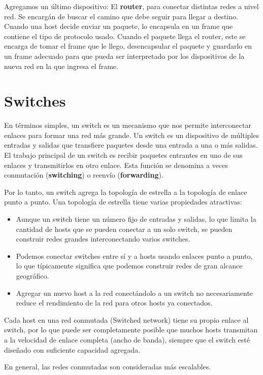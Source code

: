 Agregamos un último dispositivo: El \textbf{router}, para conectar distintas redes a nivel red. Se encargán de buscar el camino que debe seguir para llegar a destino. Cuando una host decide enviar un paquete, lo encapsula en un frame que contiene el tipo de protocolo usado. Cuando el paquete llega el router, este se encarga de tomar el frame que le llego, desencapsular el paquete y guardarlo en un frame adecuado para que pueda ser interpretado por los dispositivos de la nueva red en la que ingresa el frame.

\section{Switches}
En términos simples, un switch es un mecanismo que nos permite interconectar enlaces para formar una red más grande. Un switch es un dispositivo de múltiples entradas y salidas que transfiere paquetes desde una entrada a una o más salidas. El trabajo principal de un switch es recibir paquetes entrantes en uno de sus enlaces y transmitirlos en otro enlace. Esta función se denomina a veces conmutación (\textbf{switching}) o reenvío (\textbf{forwarding}).

Por lo tanto, un switch agrega la topología de estrella a la topología de enlace punto a punto. Una topología de estrella tiene varias propiedades atractivas:

\begin{itemize}
  \item Aunque un switch tiene un número fijo de entradas y salidas, lo que limita la cantidad de hosts que se pueden conectar a un solo switch, se pueden construir redes grandes interconectando varios switches.
  \item Podemos conectar switches entre sí y a hosts usando enlaces punto a punto, lo que típicamente significa que podemos construir redes de gran alcance geográfico.
  \item Agregar un nuevo host a la red conectándolo a un switch no necesariamente reduce el rendimiento de la red para otros hosts ya conectados.
\end{itemize}

Cada host en una red conmutada (Switched network) tiene su propio enlace al switch, por lo que puede ser completamente
posible que muchos hosts transmitan a la velocidad de enlace completa (ancho de banda),
siempre que el switch esté diseñado con suficiente capacidad agregada.

En general, las redes conmutadas son consideradas más escalables. 

